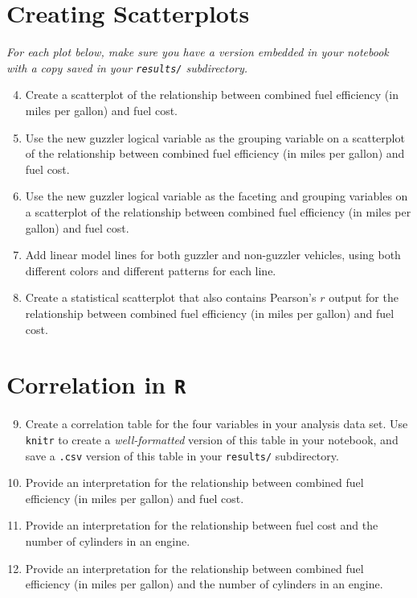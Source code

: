 \documentclass{tufte-handout}
\begin{document}
\vspace{5mm}
\section{Creating Scatterplots}
\textit{For each plot below, make sure you have a version embedded in your notebook with a copy saved in your \texttt{results/} subdirectory.}

\begin{enumerate}
\setcounter{enumi}{3}
\item Create a scatterplot of the relationship between combined fuel efficiency (in miles per gallon) and fuel cost.
\item Use the new guzzler logical variable as the grouping variable on a scatterplot of the relationship between combined fuel efficiency (in miles per gallon) and fuel cost.
\item Use the new guzzler logical variable as the faceting and grouping variables on a scatterplot of the relationship between combined fuel efficiency (in miles per gallon) and fuel cost.
\item Add linear model lines for both guzzler and non-guzzler vehicles, using both different colors and different patterns for each line.
\item Create a statistical scatterplot that also contains Pearson's $r$ output for the relationship between combined fuel efficiency (in miles per gallon) and fuel cost.
\end{enumerate}

\vspace{5mm}
\section{Correlation in \texttt{R}}
\begin{enumerate}
\setcounter{enumi}{8}
\item Create a correlation table for the four variables in your analysis data set. Use \texttt{knitr} to create a \textit{well-formatted} version of this table in your notebook, and save a \texttt{.csv} version of this table in your \texttt{results/} subdirectory.
\item Provide an interpretation for the relationship between combined fuel efficiency (in miles per gallon) and fuel cost.
\item Provide an interpretation for the relationship between fuel cost and the number of cylinders in an engine.
\item Provide an interpretation for the relationship between combined fuel efficiency (in miles per gallon) and the number of cylinders in an engine.
\end{enumerate}
\end{document}
